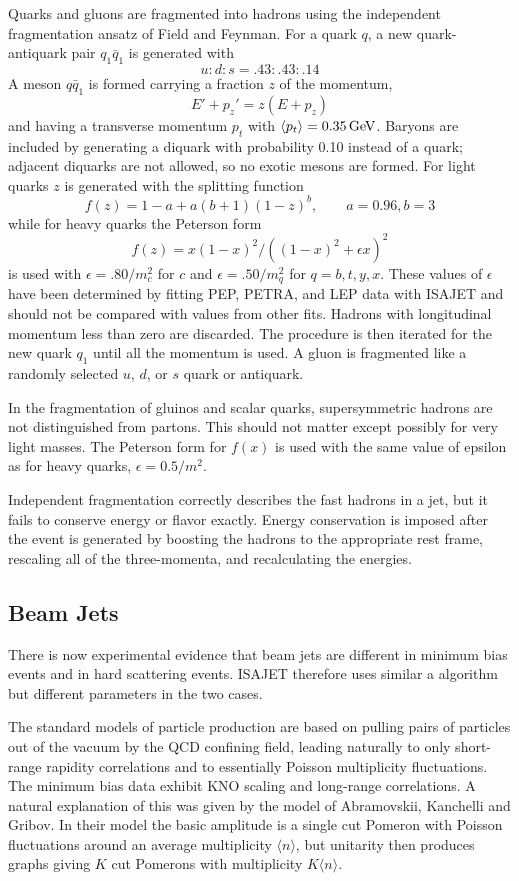       Quarks and gluons are fragmented into hadrons using the
independent fragmentation ansatz of Field and Feynman. For a quark
$q$, a new quark-antiquark pair $q_1 \bar q_1$ is generated with
$$
u : d : s = .43 : .43 : .14
$$
A meson $q \bar q_1$ is formed carrying a fraction $z$ of the momentum,
$$
E' + p_z' = z (E + p_z)
$$
and having a transverse momentum $p_t$ with $\langle p_t \rangle =
0.35\,{\rm GeV}$. Baryons are included by generating a diquark with
probability 0.10 instead of a quark; adjacent diquarks are not
allowed, so no exotic mesons are formed. For light quarks $z$ is
generated with the splitting function
$$
f(z) = 1-a + a(b+1)(1-z)^b, \qquad
a = 0.96, b = 3
$$
while for heavy quarks the Peterson form
$$
f(z) = x (1-x)^2 / ( (1-x)^2 + \epsilon x )^2
$$
is used with $\epsilon = .80 / m_c^2$ for $c$ and $\epsilon = .50 /
m_q^2$ for $q = b, t, y, x$. These values of $\epsilon$ have been
determined by fitting PEP, PETRA, and LEP data with ISAJET and should
not be compared with values from other fits. Hadrons with longitudinal
momentum less than zero are discarded. The procedure is then iterated
for the new quark $q_1$ until all the momentum is used. A gluon is
fragmented like a randomly selected $u$, $d$, or $s$ quark or
antiquark. 

      In the fragmentation of gluinos and scalar quarks, supersymmetric
hadrons are not distinguished from partons. This should not matter
except possibly for very light masses. The Peterson form for $f(x)$ is
used with the same value of epsilon as for heavy quarks, $\epsilon =
0.5 / m^2$.

      Independent fragmentation correctly describes the fast hadrons in
a jet, but it fails to conserve energy or flavor exactly. Energy
conservation is imposed after the event is generated by boosting the
hadrons to the appropriate rest frame, rescaling all of the
three-momenta, and recalculating the energies.

\subsection{Beam Jets}

      There is now experimental evidence that beam jets are different in
minimum bias events and in hard scattering events. ISAJET therefore uses
similar a algorithm but different parameters in the two cases.

      The standard models of particle production are based on pulling
pairs of particles out of the vacuum by the QCD confining field,
leading naturally to only short-range rapidity correlations and to
essentially Poisson multiplicity fluctuations. The minimum bias data
exhibit KNO scaling and long-range correlations. A natural explanation
of this was given by the model of Abramovskii, Kanchelli and Gribov.
In their model the basic amplitude is a single cut Pomeron with
Poisson fluctuations around an average multiplicity $\langle n
\rangle$, but unitarity then produces graphs giving $K$ cut Pomerons
with multiplicity $K\langle n \rangle$.

